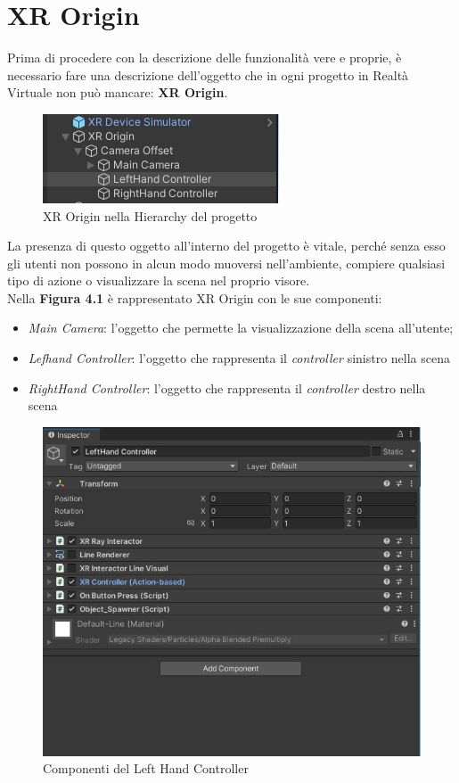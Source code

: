 \section{XR Origin}
Prima di procedere con la descrizione delle funzionalità vere e proprie, è necessario fare una descrizione dell'oggetto che in ogni progetto in Realtà Virtuale non può mancare: \textbf{XR Origin}.
\begin{figure}[H]
    \centering
    \includegraphics[scale = 1]{Immagini/XROrigin.jpg}
    \caption{XR Origin nella Hierarchy del progetto}
    \label{fig:my_label}
\end{figure}
\hspace{-0.6cm}La presenza di questo oggetto all'interno del progetto è vitale, perché senza esso gli utenti non possono in alcun modo muoversi nell'ambiente, compiere qualsiasi tipo di azione o visualizzare la scena nel proprio visore. 
\\Nella \textbf{Figura 4.1} è rappresentato XR Origin con le sue componenti:
\begin{itemize}
    \item \textit{Main Camera}: l'oggetto che permette la visualizzazione della scena all'utente;
    \item \textit{Lefhand Controller}: l'oggetto che rappresenta il \textit{controller} sinistro nella scena
    \item \textit{RightHand Controller}: l'oggetto che rappresenta il \textit{controller} destro nella scena
\end{itemize}
\begin{figure}[H]
    \centering
    \includegraphics[scale = 0.8]{Immagini/InspectorXRcontroller.jpg}
    \caption{Componenti del Left Hand Controller}
    \label{fig:my_label}
\end{figure}

